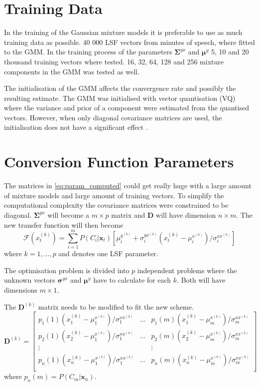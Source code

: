 \section{Training Data} %
\label{sec:training_data}
In the training of the Gaussian mixture models it is preferable to use as much training data as possible. 40 000 LSF vectors from  minutes of speech, where fitted to the GMM. In the training process of the parameters $\mathbf{\Sigma}^{yx}$ and $\boldsymbol{\mu}^y$ 5, 10 and 20 thousand training vectors where tested. 16, 32, 64, 128 and 256 mixture components in the GMM was tested as well.

The initialisation of the GMM affects the convergence rate and possibly the resulting estimate. The GMM was initialised with vector quantisation (VQ) where the variance and prior of a component were estimated from the quantised vectors. However, when only diagonal covariance matrices are used, the initialisation does not have a significant effect \cite{reynolds93}.

\section{Conversion Function Parameters} %
\label{sec:conversion_function_parameters}
The matrices in \eqref{eq:param_computed} could get really huge with a large amount of mixture models and large amount of training vectors. To simplify the computational complexity the covariance matrices were constrained to be diagonal. $\mathbf{\Sigma}^{yx}$ will become a $m\times p$ matrix and $\mathbf{D}$ will have dimension $n\times m$. The new transfer function will then become
\begin{equation}
	\mathcal{F}(x_t^{(k)}) = \sum_{i=1}^{m}P(C_i \vert \mathbf{x}_t)[\mu_i^{y^{(k)}}+\sigma_i^{yx^{(k)}}  (x_t^{(k)}-\mu_i^{x^{(k)}})/\sigma_i^{xx^{(k)}}]
\end{equation}
where $k=1,\dots,p$ and denotes one LSF parameter.

The optimisation problem is divided into $p$ independent problems where the unknown vectors $\boldsymbol{\sigma}^{yx}$ and $\boldsymbol{\mu}^{y}$ have to calculate for each $k$. Both will have dimensions $m\times 1$.

The $\mathbf{D}^{(k)}$ matrix needs to be modified to fit the new scheme.
\begin{equation}
	\label{eq:D_matrix_new}
	\mathbf{D}^{(k)} = \begin{bmatrix}
		p_1(1)(x_1^{(k)} - \mu_1^{x^{(k)}})/\sigma_1^{xx^{(k)}} & \dots & p_1(m)(x_1^{(k)} - \mu_m^{x^{(k)}})/\sigma_m^{xx^{(k)}} \\
		p_2(1)(x_2^{(k)} - \mu_1^{x^{(k)}})/\sigma_1^{xx^{(k)}} & \dots & p_2(m)(x_2^{(k)} - \mu_m^{x^{(k)}})/\sigma_m^{xx^{(k)}} \\
		\vdots & & \vdots \\
		p_n(1)(x_n^{(k)} - \mu_1^{x^{(k)}})/\sigma_1^{xx^{(k)}} & \dots & p_n(m)(x_n^{(k)} - \mu_m^{x^{(k)}})/\sigma_m^{xx^{(k)}} \\
	\end{bmatrix}
\end{equation}
where $p_n(m)=P(C_m\vert \mathbf{x}_n)$.
